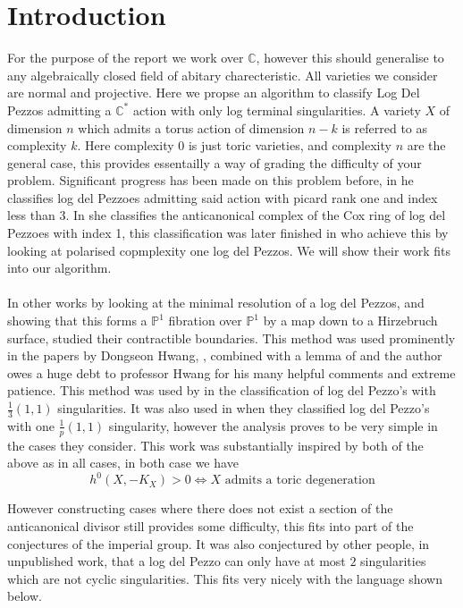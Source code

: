 \documentclass[11pt]{report}
\theoremstyle{definition}
\theoremstyle{definition}
\theoremstyle{definition}
\theoremstyle{definition}
\theoremstyle{definition}
\theoremstyle{definition}
\theoremstyle{definition}
\begin{document}
 


\section{Introduction}

For the purpose of the report we work over $\mathbb{C}$, however this should generalise to any algebraically closed field of abitary charecteristic. All varieties we consider are normal and projective. Here we propse an algorithm to classify Log Del Pezzos admitting a $\mathbb{C}^*$ action with only log terminal singularities. A variety $X$ of dimension $n$ which admits a torus action of dimension $n-k$ is referred to as complexity $k$. Here complexity 0 is just toric varieties, and complexity $n$ are the general case, this provides essentailly a way of grading the difficulty of your problem. Significant progress has been made on this problem before, in \cite{Suss} he classifies log del Pezzoes admitting said action with picard rank one and index less than 3. In \cite{Huggenberger} she classifies the anticanonical complex of the Cox ring of log del Pezzoes with index 1, this classification was later finished in \cite{IMT} who achieve this by looking at polarised copmplexity one log del Pezzos. We will show their work fits into our algorithm. 
\\
\\
In other works \cite{ZDQ} by looking at the minimal resolution of a log del Pezzos, and showing that this forms a $\mathbb{P}^1$ fibration over $\mathbb{P}^1$ by a map down to a Hirzebruch surface, studied their contractible boundaries. This method was used prominently in the papers by Dongseon Hwang, \cite{H1}, \cite{H2} combined with a lemma of \cite{Sakai} and the author owes a huge debt to professor Hwang for his many helpful comments and extreme patience. This method was used by \cite{CH} in the classification of log del Pezzo's with $\frac{1}{3} (1,1) $ singularities. It was also used in \cite{CP} when they classified log del Pezzo's with one $\frac{1}{p} (1,1)$ singularity, however the analysis proves to be very simple in the cases they consider. This work was substantially inspired by both of the above as in all cases, in both case we have 
\[
h^0 ( X, -K_X) > 0 \iff X \text{ admits a toric degeneration}
\]

However constructing cases where there does not exist a section of the anticanonical divisor still provides some difficulty, this fits into part of the conjectures of the imperial group. It was also conjectured by other people, in unpublished work, that a log del Pezzo can only have at most $2$ singularities which are not cyclic singularities. This fits very nicely with the language shown below.
\\
\\
\end{document}
